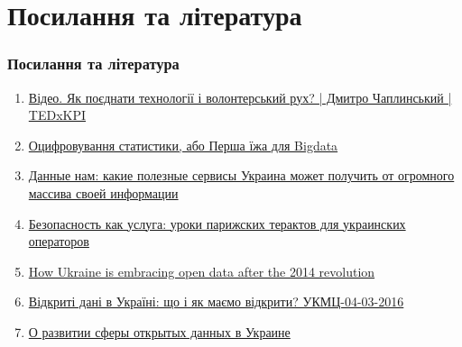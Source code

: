 \chapter{Посилання та література}
\label{sec:links-and-literature}

\subsection{Посилання та література}
\begin{enumerate}
\item \href{https://www.youtube.com/watch?v=nR9CXA6_7-I}{Відео. Як поєднати технології і волонтерський рух? | Дмитро Чаплинський | TEDxKPI}
\item \href{http://www.epravda.com.ua/publications/2015/08/20/554624}{Оцифровування статистики, або Перша їжа для Bigdata}
\item \href{http://platfor.ma/magazine/text-sq/projects/open-data-incubator/}{Данные нам: какие полезные сервисы Украина может получить от огромного массива своей информации}
\item \href{http://itc.ua/articles/bezopasnost-kak-usluga-uroki-parizhskih-teraktov-dlya-ukrainskih-operatorov}{Безопасность как услуга: уроки парижских терактов для украинских операторов}
\item \href{http://theodi.org/blog/ukraine-embracing-open-data-2014-revolution}{How Ukraine is embracing open data after the 2014 revolution}
\item \href{https://www.youtube.com/watch?v=gyHEOpX1yes}{Відкриті дані в Україні: що і як маємо відкрити? УКМЦ-04-03-2016}
\item \href{https://habrahabr.ru/post/306414/}{О развитии сферы открытых данных в Украине}
\end{enumerate}